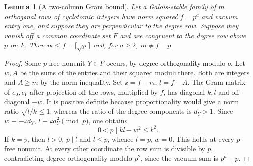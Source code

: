 \documentclass[11pt]{amsart}
\numberwithin{equation}{section}
\newtheorem{lemma}[theorem]{Lemma}
\theoremstyle{definition}
\theoremstyle{plain}
\begin{document}
\begin{lemma}[A two-column Gram bound]\label{lem:congruent-rows}
Let a Galois-stable family of $m$ orthogonal rows of cyclotomic integers have norm
squared $f=p^a$ and vacuum entry one, and suppose they are perpendicular to the degree
row. Suppose they vanish off a common coordinate set $F$ and are
congruent to the degree row above $p$ on $F$. Then
$m\le f-\lceil\sqrt p\rceil$ and, for $a\ge2$, $m\ne f-p$.
\end{lemma}
\begin{proof}
Some $p$-free nonunit $Y\in F$ occurs, by degree orthogonality modulo $p$.
Let $w,A$ be the sums of the entries and their squared moduli there.
Both are integers and $A\ge m$ by the norm inequality. Set $k=f-m$,
$l=f-A$. The Gram matrix of $e_0,e_Y$ after projection off the rows,
multiplied by $f$, has diagonal $k,l$ and off-diagonal $-w$.
It is positive definite because proportionality would give a norm ratio
$\sqrt{l/k}\le1$, whereas the ratio of the degree components is $d_Y>1$.
Since $w\equiv-kd_Y$, $l\equiv kd_Y^2\pmod p$, one obtains
\begin{equation}\label{eq:saturation-gram}0<p\mid kl-w^2\le k^2.\end{equation}
If $k=p$, then $l>0$, $p\mid l$ and $l\le p$, whence $l=p$, $w=0$.
This holds at every $p$-free nonunit. At every other coordinate the
row sum is divisible by $p$, contradicting degree orthogonality modulo
$p^2$, since the vacuum sum is $p^a-p$.
\end{proof}
\end{document}
